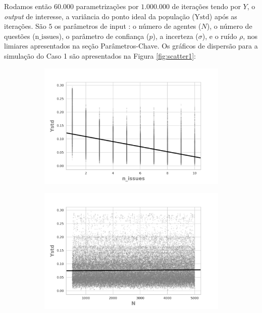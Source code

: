 Rodamos então \(60.000\) parametrizações por \(1.000.000\) de iterações tendo
por \(Y\), o \textit{output} de interesse, a variância do ponto ideal da
população (\(\text{Ystd}\)) após as iterações. São \(5\) os parâmetros de input
: o número de agentes (\(N\)), o número de questões (\(\text{n\_issues}\)), o
parâmetro de confiança (\(p\)), a incerteza (\(\sigma\)), e o ruído \(\rho\), nos
limiares apresentados na seção Parâmetros-Chave. Os gráficos de dispersão para a
simulação do Caso 1 são apresentados na Figura \ref{fig:scatter1}:

\begin{figure}[H]
    \centering
    \begin{subfigure}[b]{0.49\textwidth}
        \includegraphics[width=\textwidth]{ims/mutoregressions/regressionmutatingon_issues.png}
    \end{subfigure}
    \begin{subfigure}[b]{0.49\textwidth}
        \includegraphics[width=\textwidth]{ims/mutoregressions/regressionmutatingoN.png}
    \end{subfigure}


\end{figure}
